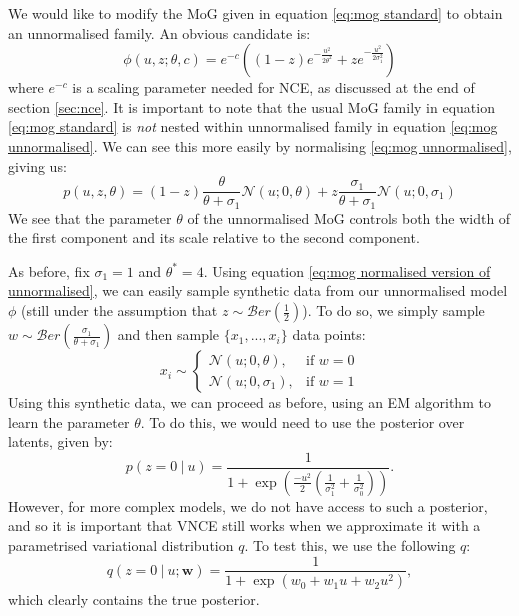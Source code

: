 \documentclass[11pt, oneside]{article}
\newcommand{\pnorm}{p}
\theoremstyle{definition}
\begin{document}
\noindent We would like to modify the MoG given in equation \ref{eq:mog standard} to obtain an unnormalised family. An obvious candidate is:
\begin{equation}
\phi(u, z; \theta, c) = e^{-c} \left( (1-z) e^{-\frac{u^2}{2 \theta^2}} + z e^{-\frac{u^2}{2 \sigma_1^2}} \right)
\label{eq:mog unnormalised}
\end{equation}
where $e^{-c}$ is a scaling parameter needed for NCE, as discussed at the end of section \ref{sec:nce}. It is important to note that the usual MoG family in equation \ref{eq:mog standard} is \emph{not} nested within unnormalised family in equation \ref{eq:mog unnormalised}. We can see this more easily by normalising \ref{eq:mog unnormalised}, giving us:
\begin{equation}
    \pnorm(u, z, \theta) = (1-z)\frac{\theta}{\theta + \sigma_1} \mathcal{N}(u; 0, \theta) +
                     z\frac{\sigma_1}{\theta + \sigma_1} \mathcal{N}(u; 0, \sigma_1)
\label{eq:mog normalised version of unnormalised}
\end{equation}
We see that the parameter $\theta$ of the unnormalised MoG controls both the width of the first component and its scale relative to the second component. 

As before, fix $\sigma_1 = 1$ and $\theta^*=4$. Using equation \ref{eq:mog normalised version of unnormalised}, we can easily sample synthetic data from our unnormalised model $\phi$ (still under the assumption that $z \sim \mathcal{B}er(\frac{1}{2})$). To do so, we simply sample $w \sim \mathcal{B}er(\frac{\sigma_1}{\theta + \sigma_1})$ and then sample $\{x_1, ..., x_i\}$ data points:
\[
    x_i \sim \left\{\begin{array}{lr}
        \mathcal{N}(u; 0, \theta), & \text{if } w = 0\\
         \mathcal{N}(u; 0, \sigma_1), & \text{if } w = 1
        \end{array}
\]
Using this synthetic data, we can proceed as before, using an EM algorithm to learn the parameter $\theta$. To do this, we would need to use the posterior over latents, given by:
\begin{equation}
    p(z=0 \ | \ u) = \frac{1}{1 + \exp(\frac{-u^2}{2} (\frac{1}{\sigma_1^2} + \frac{1}{\sigma_0^2}) )}.
\end{equation}
However, for more complex models, we do not have access to such a posterior, and so it is important that VNCE still works when we approximate it with a parametrised variational distribution $q$. To test this, we use the following $q$:
\begin{equation}
    q(z=0 \ | \ u; \textbf{w}) = \frac{1}{1 + \exp(w_0 + w_1u + w_2u^2)}, 
\end{equation}
which clearly contains the true posterior.
\end{document}
